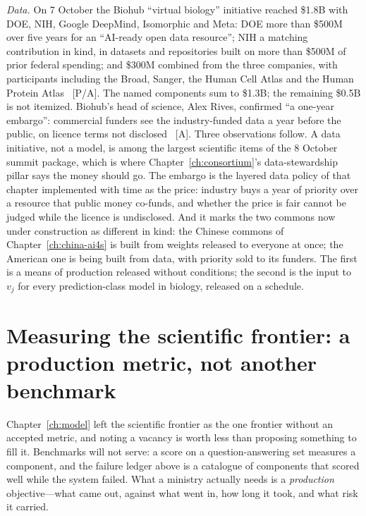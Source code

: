 \emph{Data.} On 7 October the Biohub ``virtual biology'' initiative reached \$1.8B with DOE, NIH, Google DeepMind, Isomorphic and Meta: DOE more than \$500M over five years for an ``AI-ready open data resource''; NIH a matching contribution in kind, in datasets and repositories built on more than \$500M of prior federal spending; and \$300M combined from the three companies, with participants including the Broad, Sanger, the Human Cell Atlas and the Human Protein Atlas~\cite{sci-biohub} [P/A]. The named components sum to \$1.3B; the remaining \$0.5B is not itemized. Biohub's head of science, Alex Rives, confirmed ``a one-year embargo'': commercial funders see the industry-funded data a year before the public, on licence terms not disclosed~\cite{sci-biohub-embargo} [A]. Three observations follow. A data initiative, not a model, is among the largest scientific items of the 8 October summit package, which is where Chapter~\ref{ch:consortium}'s data-stewardship pillar says the money should go. The embargo is the layered data policy of that chapter implemented with time as the price: industry buys a year of priority over a resource that public money co-funds, and whether the price is fair cannot be judged while the licence is undisclosed. And it marks the two commons now under construction as different in kind: the Chinese commons of Chapter~\ref{ch:china-ai4s} is built from weights released to everyone at once; the American one is being built from data, with priority sold to its funders. The first is a means of production released without conditions; the second is the input to $v_j$ for every prediction-class model in biology, released on a schedule.

\section{Measuring the scientific frontier: a production metric, not another benchmark}
\label{sec:sci-metric}

Chapter~\ref{ch:model} left the scientific frontier as the one frontier without an accepted metric, and noting a vacancy is worth less than proposing something to fill it. Benchmarks will not serve: a score on a question-answering set measures a component, and the failure ledger above is a catalogue of components that scored well while the system failed. What a ministry actually needs is a \emph{production} objective---what came out, against what went in, how long it took, and what risk it carried.

